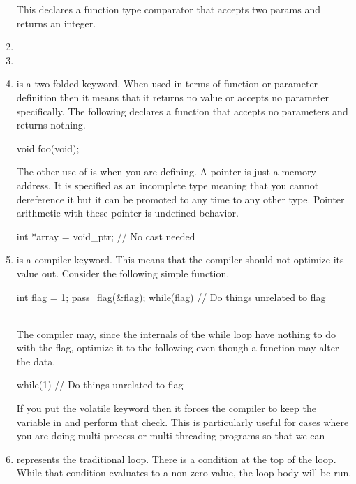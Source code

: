 \begin{enumerate}
This declares a function type comparator that accepts two  params and returns an integer.

\item {}
\item {}
\item {} is a two folded keyword. When used in terms of function or parameter definition then it means that it returns no value or accepts no parameter specifically. The following declares a function that accepts no parameters and returns nothing.

\begin{code}[language=C]
void foo(void);
\end{code}


The other use of  is when you are defining. A  pointer is just a memory address. It is specified as an incomplete type meaning that you cannot dereference it but it can be promoted to any time to any other type. Pointer arithmetic with these pointer is undefined behavior.

\begin{code}[langauge=C]
int *array = void_ptr; // No cast needed
\end{code}

\item {} is a compiler keyword. This means that the compiler should not optimize its value out. Consider the following simple function.
\\
\begin{code}[language=C]
int flag = 1;
pass_flag(&flag);
while(flag) {
    // Do things unrelated to flag
}
\end{code}
\\
The compiler may, since the internals of the while loop have nothing to do with the flag, optimize it to the following even though a function may alter the data.
\\
\begin{code}[language=C]
while(1) {
    // Do things unrelated to flag
}
\end{code}
If you put the volatile keyword then it forces the compiler to keep the variable in and perform that check. This is particularly useful for cases where you are doing multi-process or multi-threading programs so that we can
\item {} represents the traditional  loop. There is a condition at the top of the loop. While that condition evaluates to a non-zero value, the loop body will be run.
\end{enumerate}

